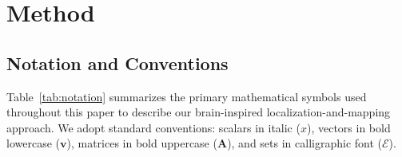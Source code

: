 \section{Method}
\label{sec:method}

\subsection{Notation and Conventions}

Table~\ref{tab:notation} summarizes the primary mathematical symbols used throughout this paper to describe our brain-inspired lo\-cal\-i\-za\-tion-and-map\-ping approach. We adopt standard conventions: scalars in italic ($x$), vectors in bold lowercase ($\mathbf{v}$), matrices in bold uppercase ($\mathbf{A}$), and sets in calligraphic font ($\mathcal{E}$).

